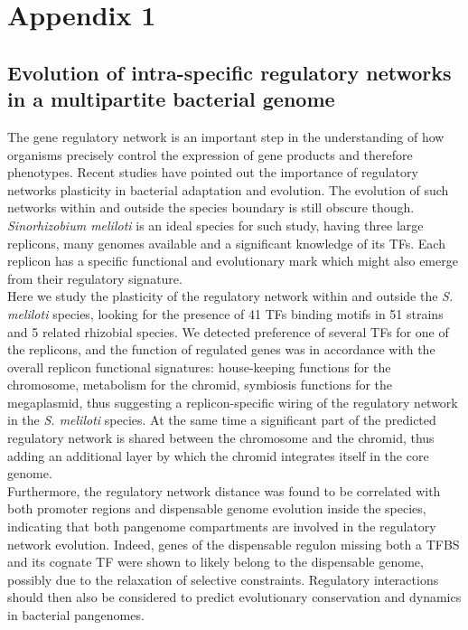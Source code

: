 \logvartrue
\chapter{Appendix 1}

\section[Evolution of intra-specific regulatory networks in a multipartite bacterial genome]{Evolution of intra-specific regulatory networks in a multipartite bacterial genome%
}

The gene regulatory network is an important step in the understanding of how organisms precisely control the expression of gene products and therefore phenotypes. Recent studies have pointed out the importance of regulatory networks plasticity in bacterial adaptation and evolution. The evolution of such networks within and outside the species boundary is still obscure though. \textit{Sinorhizobium meliloti} is an ideal species for such study, having three large replicons, many genomes available and a significant knowledge of its TFs. Each replicon has a specific functional and evolutionary mark which might also emerge from their regulatory signature.\\
Here we study the plasticity of the regulatory network within and outside the \textit{S. meliloti} species, looking for the presence of 41 TFs binding motifs in 51 strains and 5 related rhizobial species. We detected preference of several TFs for one of the replicons, and the function of regulated genes was in accordance with the overall replicon functional signatures: house-keeping functions for the chromosome, metabolism  for the chromid, symbiosis functions for the megaplasmid, thus suggesting a replicon-specific wiring of the regulatory network in the \textit{S. meliloti} species. At the same time a significant part of the predicted regulatory network is shared between the chromosome and the chromid, thus adding an additional layer by which the chromid integrates itself in the core genome.\\
Furthermore, the regulatory network distance was found to be correlated with both promoter regions and dispensable genome evolution inside the species, indicating that both pangenome compartments are involved in the regulatory network evolution. Indeed, genes of the dispensable regulon missing both a TFBS and its cognate TF were shown to likely belong to the dispensable genome, possibly due to the relaxation of selective constraints. Regulatory interactions should then also be considered to predict evolutionary conservation and dynamics in bacterial pangenomes.\\

